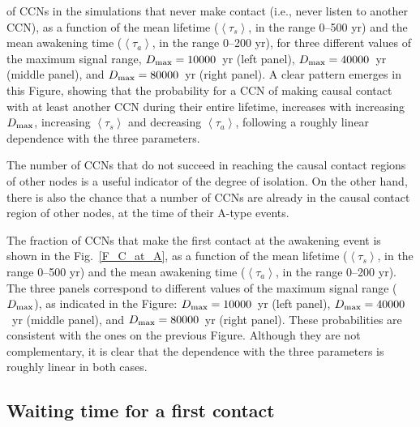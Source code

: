 \documentclass[crop]{CSLB}
\newcommand{\ceti}{CCN}
\newcommand{\cetis}{CCNs}
\newcommand{\ffn}[1]{}
\begin{document}
of \cetis{} in the simulations that never make contact (i.e., never
listen to another \ceti{}), as a function of the mean lifetime
($\left<\tau_s\right>$, in the range 0--500 yr) and the mean awakening
time ($\left<\tau_a\right>$, in the range 0--200 yr), for three
different values of the maximum signal range, $D_{\rm max}=10000$~yr (left
panel), $D_{\rm max}=40000$~yr (middle panel), and $D_{\rm max}=80000$~yr
(right panel).
%
A clear pattern emerges in this Figure, showing that the probability
for a \ceti{} of making causal contact with at least another \ceti{}
during their entire lifetime, increases with increasing $D_{\rm max}$,
increasing $\left<\tau_s\right>$ and decreasing $\left<\tau_a\right>$,
following a roughly linear dependence with the three parameters.


The number of \cetis{} that do not succeed in reaching the
causal contact regions of other nodes is a useful indicator of
the
degree of isolation.
%
On the other hand, there is also the chance that a number of
\cetis{} are already in the causal contact region of other nodes,
at the time of their A-type events.
%
\ffn{5}
%
The fraction of \cetis{} that make the first contact at the awakening
event is shown in the Fig.~\ref{F_C_at_A}, 
as a function of the mean lifetime
($\left<\tau_s\right>$, in the range 0--500 yr) and the mean awakening
time ($\left<\tau_a\right>$, in the range 0--200 yr).
%
The three panels correspond to different values of the maximum signal
range ($D_{\rm max}$),
as indicated in the Figure:
%
$D_{\rm max}=10000$~yr (left
panel), $D_{\rm max}=40000$~yr (middle panel), and $D_{\rm max}=80000$~yr
(right panel).
%
These probabilities are consistent with the ones on the previous
Figure.
%
Although they are not complementary, it is clear that the dependence
with the three parameters is roughly linear in both cases.
%


%


\subsection{Waiting time for a first contact}\label{SS_waiting}
\end{document}
